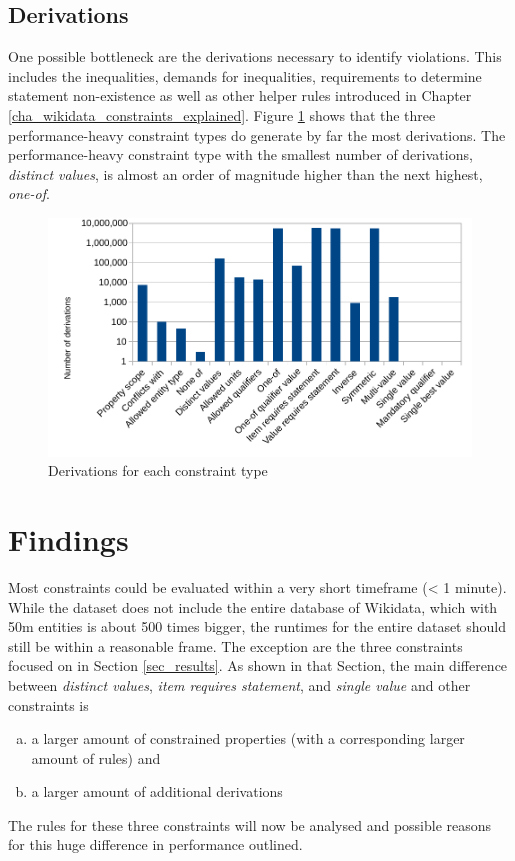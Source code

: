 \documentclass[hyperref,bachelorofscience,fleqn]{cgvpub}
\begin{document}
\subsection{Derivations}
One possible bottleneck are the derivations necessary to identify violations. This includes the inequalities, demands for inequalities, requirements to determine statement non-existence as well as other helper rules introduced in Chapter \ref{cha_wikidata_constraints_explained}. Figure \ref{fig_derivations} shows that the three performance-heavy constraint types do generate by far the most derivations. The performance-heavy constraint type with the smallest number of derivations, \emph{distinct values}, is almost an order of magnitude higher than the next highest, \emph{one-of}.

\begin{figure}
\includegraphics[width=\linewidth]{images/Derivations.pdf}
\caption{Derivations for each constraint type}\label{fig_derivations}
\end{figure}

\section{Findings}
Most constraints could be evaluated within a very short timeframe (< 1 minute). While the dataset does not include the entire database of Wikidata, which with 50m entities is about 500 times bigger, the runtimes for the entire dataset should still be within a reasonable frame. The exception are the three constraints focused on in Section \ref{sec_results}. As shown in that Section, the main difference between \emph{distinct values}, \emph{item requires statement}, and \emph{single value} and other constraints is
\begin{enumerate}[a)]
\item a larger amount of constrained properties (with a corresponding larger amount of rules) and
\item a larger amount of additional derivations
\end{enumerate}
The rules for these three constraints will now be analysed and possible reasons for this huge difference in performance outlined.
\end{document}
